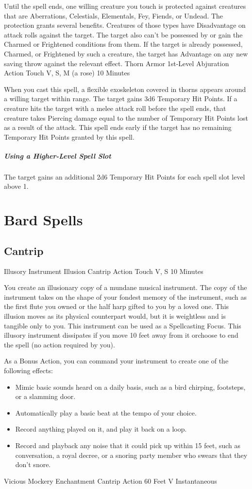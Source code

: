 \documentclass[letterpaper,openany,oneside,twocolumn]{book}
\begin{document}
Until the spell ends, one willing creature you touch is protected against creatures that are Aberrations, Celestials, Elementals, Fey, Fiends, or Undead. The protection grants several benefits. Creatures of those types have Disadvantage on attack rolls against the target. The target also can't be possessed by or gain the Charmed or Frightened conditions from them. If the target is already possessed, Charmed, or Frightened by such a creature, the target has Advantage on any new saving throw against the relevant effect.
\DndSpellHeader
  {Thorn Armor}
  {1st-Level Abjuration}
  {Action}
  {Touch}
  {V, S, M (a rose)}
  {10 Minutes}
  
When you cast this spell, a flexible exoskeleton covered in thorns appears around a willing target within range. The target gains 3d6 Temporary Hit Points. If a creature hits the target with a melee attack roll before the spell ends, that creature takes Piercing damage equal to the number of Temporary Hit Points lost as a result of the attack. This spell ends early if the target has no remaining Temporary Hit Points granted by this spell.

\subparagraph*{Using a Higher-Level Spell Slot} The target gains an additional 2d6 Temporary Hit Points for each spell slot level above 1.
\clearpage
\section*{Bard Spells}
\subsection*{Cantrip}
\DndSpellHeader
  {Illusory Instrument}
  {Illusion Cantrip}
  {Action}
  {Touch}
  {V, S}
  {10 Minutes}

You create an illusionary copy of a mundane musical instrument. The copy of the instrument takes on the shape of your fondest memory of the instrument, such as the first flute you owned or the half harp gifted to you by a loved one. This illusion moves as its physical counterpart would, but it is weightless and is tangible only to you. This instrument can be used as a Spellcasting Focus. This illusory instrument dissipates if you move 10 feet away from it orchoose to end the spell (no action required by you).

As a Bonus Action, you can command your instrument to create one of the following effects:
\begin{itemize}
	\item Mimic basic sounds heard on a daily basis, such as a bird chirping, footsteps, or a slamming door.
	\item Automatically play a basic beat at the tempo of your choice.
	\item Record anything played on it, and play it back on a loop.
	\item Record and playback any noise that it could pick up within 15 feet, such as conversation, a royal decree, or a snoring party member who swears that they don't snore.
\end{itemize}
\DndSpellHeader
  {Vicious Mockery}
  {Enchantment Cantrip}
  {Action}
  {60 Feet}
  {V}
  {Instantaneous}
\end{document}
